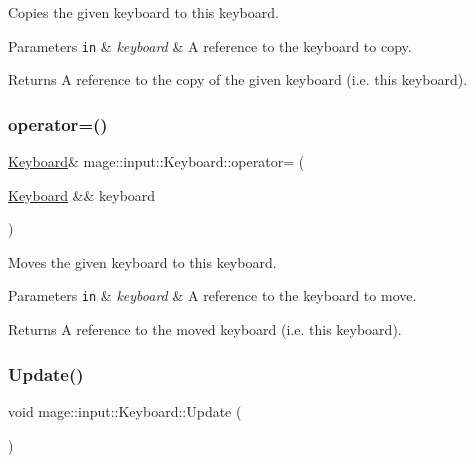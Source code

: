 Copies the given keyboard to this keyboard.


\begin{DoxyParams}[1]{Parameters}
\mbox{\tt in}  & {\em keyboard} & A reference to the keyboard to copy. \\
\hline
\end{DoxyParams}
\begin{DoxyReturn}{Returns}
A reference to the copy of the given keyboard (i.\+e. this keyboard). 
\end{DoxyReturn}
\hypertarget{classmage_1_1input_1_1_keyboard_a7dc2316d53a043fa42e4909bd8e58bb9}{}\label{classmage_1_1input_1_1_keyboard_a7dc2316d53a043fa42e4909bd8e58bb9} 
\subsubsection{\texorpdfstring{operator=()}{operator=()}\hspace{0.1cm}{\footnotesize\ttfamily [2/2]}}
{\footnotesize\ttfamily \hyperlink{classmage_1_1input_1_1_keyboard}{Keyboard}\& mage\+::input\+::\+Keyboard\+::operator= (\begin{DoxyParamCaption}\item[{\hyperlink{classmage_1_1input_1_1_keyboard}{Keyboard} \&\&}]{keyboard }\end{DoxyParamCaption})\hspace{0.3cm}{\ttfamily [delete]}}

Moves the given keyboard to this keyboard.


\begin{DoxyParams}[1]{Parameters}
\mbox{\tt in}  & {\em keyboard} & A reference to the keyboard to move. \\
\hline
\end{DoxyParams}
\begin{DoxyReturn}{Returns}
A reference to the moved keyboard (i.\+e. this keyboard). 
\end{DoxyReturn}
\hypertarget{classmage_1_1input_1_1_keyboard_a14e53eed6b75a2c45ca3caf94d797bc0}{}\label{classmage_1_1input_1_1_keyboard_a14e53eed6b75a2c45ca3caf94d797bc0} 
\subsubsection{\texorpdfstring{Update()}{Update()}}
{\footnotesize\ttfamily void mage\+::input\+::\+Keyboard\+::\+Update (\begin{DoxyParamCaption}{ }\end{DoxyParamCaption})\hspace{0.3cm}{\ttfamily [noexcept]}}

